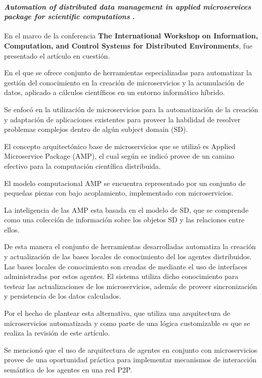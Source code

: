 \paragraph{
    \textbf{\emph{Automation of distributed data management in applied 
                    microservices package for scientific computations
            }
    }
    \cite{oparin_automation_2020}.
}

En el marco de la conferencia 
\textbf{The International Workshop on Information, Computation, and Control Systems for Distributed Environments}, 
fue presentado el artículo en cuestión. 

En el que se ofrece conjunto de herramientas especializadas para automatizar la gestión del conocimiento en
la creación de microservicios y la acumulación de datos, aplicado a 
cálculos científicos en un entorno informático híbrido.

Se enfocó en la utilización de microservicios para la automatización de la creación y adaptación de aplicaciones existentes
para proveer la habilidad de resolver problemas complejos dentro de algún subject domain (SD).

El concepto arquitectónico base de microservicios que se utilizó es Applied Microservice Package (AMP),
el cual según se indicó provee de un camino efectivo para la computación científica distribuida.

El modelo computacional AMP se encuentra representado por un conjunto de pequeñas piezas con bajo acoplamiento, 
implementado con microservicios.

La inteligencia de las AMP esta basada en el modelo de SD, 
que se comprende como una colección de información sobre los objetos SD y las relaciones entre ellos.

De esta manera el conjunto de herramientas desarrolladas automatiza la creación y actualización
de las bases locales de conocimiento del los agentes distribuidos. Las bases locales de conocimiento 
son creadas de mediante el uso de interfaces administradas por estos agentes. 
El sistema utiliza dicho conocimiento para testear las actualizaciones de los microservicios, 
además de proveer sincronización y persistencia de los datos calculados.
 
Por el hecho de plantear esta alternativa, que utiliza una arquitectura de microservicios automatizada y como parte de una 
lógica customizable es que se realiza la revisión de este artículo.


Se mencionó que el uso de arquitectura de agentes en conjunto con microservicios provee de una oportunidad práctica 
para implementar mecanismos de interacción semántica de los agentes en una red P2P. 

